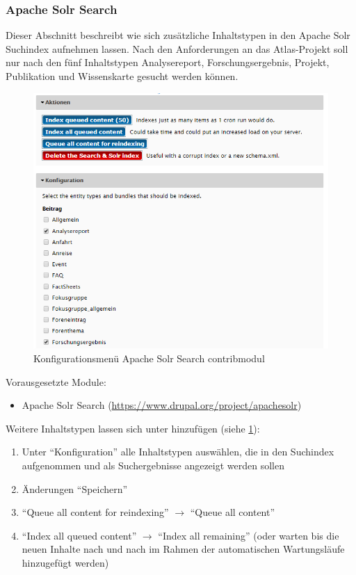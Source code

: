 \subsubsection{Apache Solr Search}\label{subsub:apachesolr}
Dieser Abschnitt beschreibt wie sich zusätzliche Inhaltstypen in den Apache Solr Suchindex aufnehmen lassen. Nach den Anforderungen an das Atlas-Projekt soll nur nach den fünf Inhaltstypen Analysereport, Forschungsergebnis, Projekt, Publikation und Wissenskarte gesucht werden können.

\begin{figure}[H]
	\centering
	\includegraphics[height=0.20\textheight]{images/config_apachesolr}
	\caption{Konfigurationsmenü Apache Solr Search \gls{contribmodul}}
	\label{fig:config_apachesolr}
\end{figure}

Vorausgesetzte Module:
\begin{itemize}
	\item Apache Solr Search (\url{https://www.drupal.org/project/apachesolr})
\end{itemize}

Weitere Inhaltstypen lassen sich unter  hinzufügen (siehe \cref{fig:config_apachesolr}):
\begin{enumerate}[parsep=0pt, itemsep=5.0pt plus 2.0pt minus 1.0pt]
	\item Unter \enquote{Konfiguration} alle Inhaltstypen auswählen, die in den Suchindex aufgenommen und als Suchergebnisse angezeigt werden sollen
	\item Änderungen \enquote{Speichern}
	\item \enquote{Queue all content for reindexing} $\rightarrow$ \enquote{Queue all content}
	\item \enquote{Index all queued content} $\rightarrow$ \enquote{Index all remaining} (oder warten bis die neuen Inhalte nach und nach im Rahmen der automatischen Wartungsläufe hinzugefügt werden)
\end{enumerate}





